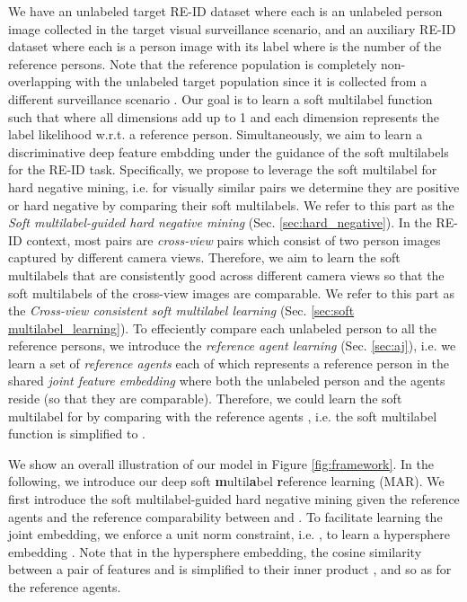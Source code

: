 \documentclass[10pt,twocolumn,letterpaper]{article}
\begin{document}
We have an unlabeled target RE-ID dataset  where each  is an unlabeled person image
collected in the target visual surveillance scenario,
and an auxiliary RE-ID dataset  where each  is a person image
with its label  where  is the number of the
reference persons.
Note that the reference population is completely
non-overlapping with the unlabeled target population since it is
collected from a different surveillance scenario
\cite{2018_CVPR_PTGAN,2018_CVPR_SPGAN,2018_ECCV_HHL}.
Our goal is to learn a soft multilabel function  such that  where
all dimensions add up to 1 and each dimension represents the label likelihood w.r.t. a reference person.
Simultaneously, we aim to learn a discriminative deep feature embdding  under the guidance of the soft multilabels for the RE-ID task.
Specifically, we propose to leverage the soft multilabel for hard negative mining,
i.e. for visually similar pairs we determine they are positive or hard negative
by comparing their soft multilabels.
We refer to this part as the \emph{Soft multilabel-guided hard negative mining} (Sec. \ref{sec:hard_negative}).
In the RE-ID context, most pairs are \emph{cross-view} pairs which consist of two person images captured by different camera views.
Therefore, we aim to learn the soft multilabels that are consistently
good across different camera views
so that the soft multilabels of the cross-view images are comparable.
We refer to this part as the \emph{Cross-view consistent soft multilabel learning} (Sec. \ref{sec:soft multilabel_learning}).
To effeciently compare each unlabeled person  to all the reference persons,
we introduce the \emph{reference agent learning} (Sec. \ref{sec:aj}),
i.e. we learn a set of \emph{reference agents} 
each of which represents a reference person in the shared \emph{joint feature embedding}
where both the unlabeled person  and the agents  reside (so that they are comparable).
Therefore, we could learn the soft multilabel  for  by comparing  with the reference agents ,
i.e. the soft multilabel function is simplified to .

We show an overall illustration of our model in Figure \ref{fig:framework}.
In the following, we introduce our deep soft \textbf{m}ultil\textbf{a}bel \textbf{r}eference learning (MAR).
We first introduce the soft multilabel-guided hard negative mining
given the reference agents  and the reference comparability between  and .
To facilitate learning the joint embedding, we enforce a unit norm constraint,
i.e. , to learn a hypersphere embedding \cite{2017_ACMMM_normface,2017_CVPR_sphereface}.
Note that in the hypersphere embedding, the cosine similarity between a pair of features  and 
is simplified to their inner product ,
and so as for the reference agents.
\end{document}
